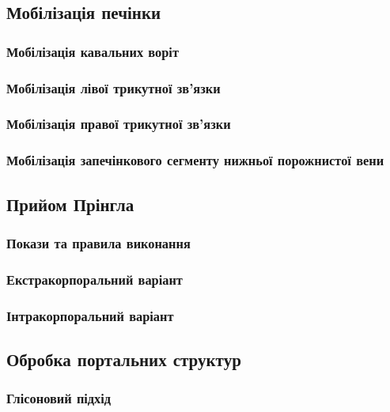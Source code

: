 \begin{refsection}
\subsection{Мобілізація печінки}

\subsubsection{Мобілізація кавальних воріт}

\subsubsection{Мобілізація лівої трикутної зв'язки}

\subsubsection{Мобілізація правої трикутної зв'язки}

\subsubsection{Мобілізація запечінкового сегменту нижньої порожнистої вени}

\subsection{Прийом Прінгла}

\subsubsection{Покази та правила виконання}

\subsubsection{Екстракорпоральний варіант}

\subsubsection{Інтракорпоральний варіант}

\subsection{Обробка портальних структур}

\subsubsection{Глісоновий підхід}


\end{refsection}
